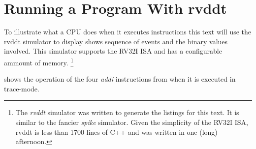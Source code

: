 \section{Running a Program With rvddt}

To illustrate what a CPU does when it executes instructions this text
will use the \gls{rvddt} simulator to display shows sequence of events 
and the binary values involved.  This simulator supports the RV32I ISA 
and has a configurable ammount of memory.%
\footnote{The {\em rvddt} simulator was written to generate the listings for 
this text.  It is similar to the fancier {\em spike} simulator.  
Given the simplicity of the RV32I ISA, rvddt is less than 1700 lines of C++ 
and was written in one (long) afternoon.}

 shows the operation of the four 
{\em addi} instructions from  when it is executed
in trace-mode.


